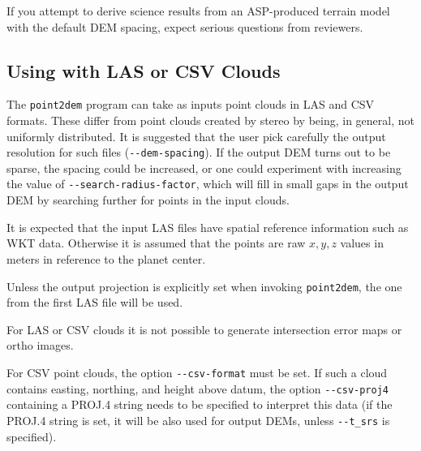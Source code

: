 If you attempt to derive science results from an ASP-produced terrain model
with the default \ac{DEM} spacing, expect serious questions from reviewers.

\subsection{Using with LAS or CSV Clouds}

The \texttt{point2dem} program can take as inputs point clouds in LAS
and CSV formats. These differ from point clouds created by stereo by
being, in general, not uniformly distributed.  It is suggested that the
user pick carefully the output resolution for such files
(\texttt{-\/-dem-spacing}). If the output \ac{DEM} turns out to be sparse,
the spacing could be increased, or one could experiment with increasing
the value of \texttt{-\/-search-radius-factor}, which will fill in small
gaps in the output \ac{DEM} by searching further for points in the input
clouds.

It is expected that the input LAS files have spatial reference
information such as WKT data. Otherwise it is assumed that the points
are raw $x,y,z$ values in meters in reference to the planet center.

Unless the output projection is explicitly set when invoking \texttt{point2dem},
the one from the first LAS file will be used.

For LAS or CSV clouds it is not possible to generate intersection error
maps or ortho images.

For CSV point clouds, the option \texttt{-\/-csv-format} must be set. If
such a cloud contains easting, northing, and height above datum, the
option \texttt{-\/-csv-proj4} containing a PROJ.4 string needs to be
specified to interpret this data (if the PROJ.4 string is set, it will be also
used for output DEMs, unless \texttt{-\/-t\_srs} is specified).


